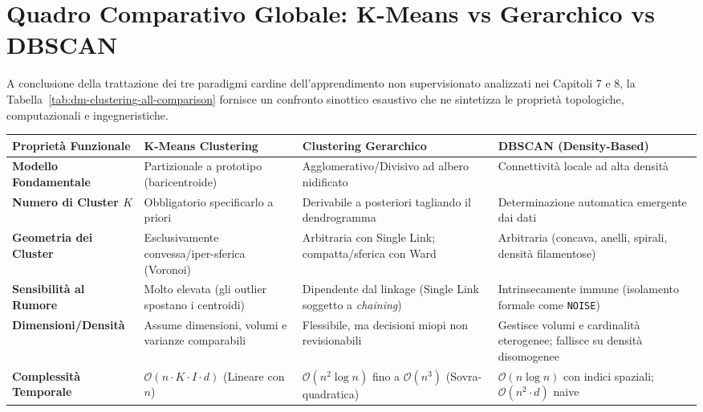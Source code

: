 \section{Quadro Comparativo Globale: K-Means vs Gerarchico vs DBSCAN}
\label{sec:dm-clustering-comprehensive-comparison}

A conclusione della trattazione dei tre paradigmi cardine dell'apprendimento non supervisionato analizzati nei Capitoli 7 e 8, la Tabella~\ref{tab:dm-clustering-all-comparison} fornisce un confronto sinottico esaustivo che ne sintetizza le proprietà topologiche, computazionali e ingegneristiche.

\begin{table}[htbp]
\centering
\scriptsize
\renewcommand{\arraystretch}{1.35}
\begin{tabularx}{\textwidth}{l Y Y Y}
\toprule
\textbf{Proprietà Funzionale} & \textbf{K-Means Clustering} & \textbf{Clustering Gerarchico} & \textbf{DBSCAN (Density-Based)} \\
\midrule
\textbf{Modello Fondamentale} & Partizionale a prototipo (baricentroide) & Agglomerativo/Divisivo ad albero nidificato & Connettività locale ad alta densità \\
\textbf{Numero di Cluster $K$} & Obbligatorio specificarlo a priori & Derivabile a posteriori tagliando il dendrogramma & Determinazione automatica emergente dai dati \\
\textbf{Geometria dei Cluster} & Esclusivamente convessa/iper-sferica (Voronoi) & Arbitraria con Single Link; compatta/sferica con Ward & Arbitraria (concava, anelli, spirali, densità filamentose) \\
\textbf{Sensibilità al Rumore} & Molto elevata (gli outlier spostano i centroidi) & Dipendente dal linkage (Single Link soggetto a \textit{chaining}) & Intrinsecamente immune (isolamento formale come \texttt{NOISE}) \\
\textbf{Dimensioni/Densità} & Assume dimensioni, volumi e varianze comparabili & Flessibile, ma decisioni miopi non revisionabili & Gestisce volumi e cardinalità eterogenee; fallisce su densità disomogenee \\
\textbf{Complessità Temporale} & $\mathcal{O}(n \cdot K \cdot I \cdot d)$ (Lineare con $n$) & $\mathcal{O}(n^2 \log n)$ fino a $\mathcal{O}(n^3)$ (Sovra-quadratica) & $\mathcal{O}(n \log n)$ con indici spaziali; $\mathcal{O}(n^2 \cdot d)$ naive \\

\end{tabularx}
\end{table}
